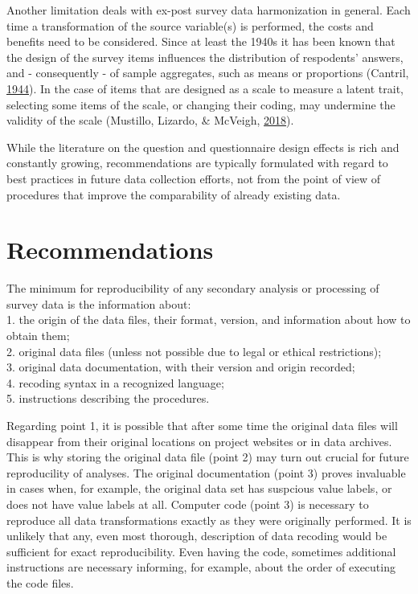 \documentclass[12pt,]{article}
\begin{document}
Another limitation deals with ex-post survey data harmonization in general. Each time a transformation of the source variable(s) is performed, the costs and benefits need to be considered. Since at least the 1940s it has been known that the design of the survey items influences the distribution of respodents' answers, and - consequently - of sample aggregates, such as means or proportions (Cantril, \protect\hyperlink{ref-Cantril1944}{1944}). In the case of items that are designed as a scale to measure a latent trait, selecting some items of the scale, or changing their coding, may undermine the validity of the scale (Mustillo, Lizardo, \& McVeigh, \protect\hyperlink{ref-Mustillo2018}{2018}).

While the literature on the question and questionnaire design effects is rich and constantly growing, recommendations are typically formulated with regard to best practices in future data collection efforts, not from the point of view of procedures that improve the comparability of already existing data.

\hypertarget{recommendations}{%
\section{Recommendations}\label{recommendations}}

The minimum for reproducibility of any secondary analysis or processing of survey data is the information about:\\
1. the origin of the data files, their format, version, and information about how to obtain them;\\
2. original data files (unless not possible due to legal or ethical restrictions);\\
3. original data documentation, with their version and origin recorded;\\
4. recoding syntax in a recognized language;\\
5. instructions describing the procedures.

Regarding point 1, it is possible that after some time the original data files will disappear from their original locations on project websites or in data archives. This is why storing the original data file (point 2) may turn out crucial for future reproducility of analyses. The original documentation (point 3) proves invaluable in cases when, for example, the original data set has suspcious value labels, or does not have value labels at all. Computer code (point 3) is necessary to reproduce all data transformations exactly as they were originally performed. It is unlikely that any, even most thorough, description of data recoding would be sufficient for exact reproducibility. Even having the code, sometimes additional instructions are necessary informing, for example, about the order of executing the code files.
\end{document}
